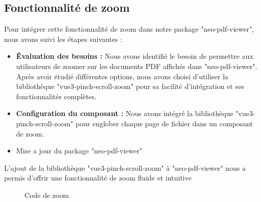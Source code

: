 \subsection{Fonctionnalité de zoom}

Pour intégrer cette fonctionnalité de zoom dans notre package "neo-pdf-viewer", nous avons suivi les étapes suivantes :
\begin{itemize}
    \item \textbf{Évaluation des besoins :} Nous avons identifié le besoin de permettre aux utilisateurs de zoomer sur les documents PDF affichés dans "neo-pdf-viewer". Après avoir étudié différentes options, nous avons choisi d'utiliser la bibliothèque "vue3-pinch-scroll-zoom" pour sa facilité d'intégration et ses fonctionnalités complètes.
    \item \textbf{Configuration du composant :} Nous avons intégré la bibliothèque "vue3-pinch-scroll-zoom" pour englober chaque page de fichier dans un composant de zoom. 
    \item Mise a jour du package "neo-pdf-viewer" 
\end{itemize}

L'ajout de la bibliothèque "vue3-pinch-scroll-zoom" à "neo-pdf-viewer" nous a permis d'offrir une fonctionnalité de zoom fluide et intuitive

\begin{figure}[H]
    \centering
    \caption{Code de zoom}
    \label{fig:zoom_code}
\end{figure}

\label{appendix:neo-pdf-viewer}
